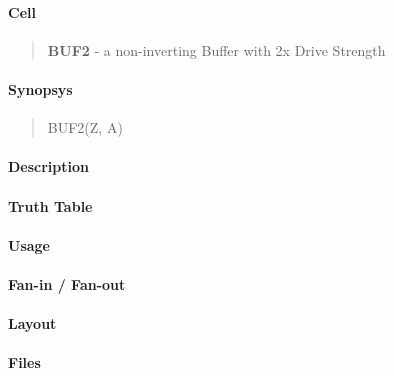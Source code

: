 \label{BUF2}
\paragraph{Cell}
\begin{quote}
    \textbf{BUF2} - a non-inverting Buffer with 2x Drive Strength
\end{quote}

\paragraph{Synopsys}
\begin{quote}
    BUF2(Z, A)
\end{quote}

\paragraph{Description}



\paragraph{Truth Table}


\paragraph{Usage}

\paragraph{Fan-in / Fan-out}

\paragraph{Layout}

\paragraph{Files}
